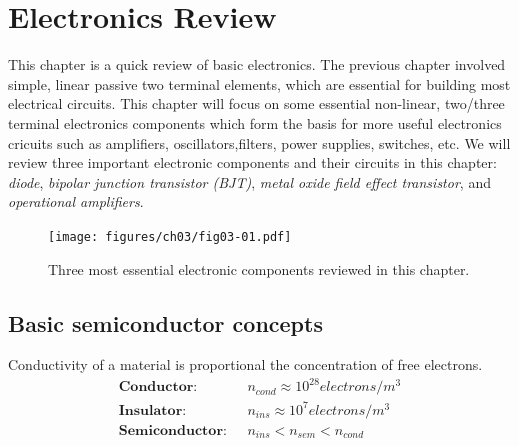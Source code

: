 \chapter{Electronics Review}\label{chp:electronics}

This chapter is a quick review of basic electronics. The previous chapter involved simple, linear passive two terminal elements, which are essential for building most electrical circuits. This chapter will focus on some essential non-linear, two/three terminal electronics components which form the basis for more useful electronics cricuits such as amplifiers, oscillators,filters, power supplies, switches, etc. We will review three important electronic components and their circuits in this chapter: \textit{diode}, \textit{bipolar junction transistor (BJT)}, \textit{metal oxide field effect transistor}, and \textit{operational amplifiers}.

\begin{figure}[b]
    \centering
    \texttt{[image: figures/ch03/fig03-01.pdf]}
    \caption{Three most essential electronic components reviewed in this chapter.}
    \label{fig:03-01}
\end{figure}

\section{Basic semiconductor concepts}
Conductivity of a material is proportional the concentration of free electrons.
\begin{equation}
    \begin{split}
    \textbf{Conductor: }\,\, & n_{cond} \approx 10^{28} electrons/m^3 \\
    \textbf{Insulator: }\,\, & n_{ins} \approx 10^{7} electrons/m^3 \\
    \textbf{Semiconductor: }\,\, & n_{ins} < n_{sem} < n_{cond}
    \end{split}
    \label{eq:ch03-elec-conc}
\end{equation}

